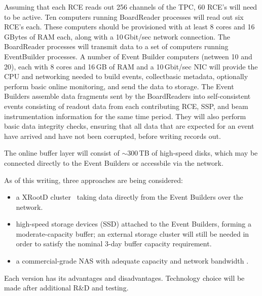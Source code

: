 Assuming that each RCE reads out 256 channels of the TPC, 60 RCE's
will need to be active.  Ten computers running BoardReader
processes will read out six RCE's each.  These computers should be
provisioned with at least 8 cores and 16 GBytes of RAM each, along
with a 10\,Gbit/sec network connection.  The BoardReader processes will
transmit data to a set of computers running EventBuilder processes.
A number of Event Builder computers (netween 10 and 20), each with 8 cores and 16\,GB of RAM
and a 10\,Gbit/sec NIC will provide the CPU and networking needed to
build events, collectbasic metadata, optionally perform basic online monitoring,
and send the data to storage.  The Event Builders assemble data fragments sent by the
BoardReaders into self-consistent events consisting of readout data
from each contributing RCE, SSP, and beam instrumentation information
for the same time period.  They will also perform basic data integrity
checks, ensuring that all data that are expected for an event have
arrived and have not been corrupted, before writing records out.

The online buffer layer will consist of $\sim$300\,TB of high-speed disks, which may be connected directly to the Event Builders
or accessbile via the network.  

As of this writing, three approaches are being considered:
\begin{itemize}
\item a XRootD cluster~\cite{xrootd} taking data directly from the Event Builders over the network.

\item high-speed storage devices (SSD) attached to the Event Builders, forming a moderate-capacity buffer;
an external storage cluster will still be needed in order to satisfy the nominal 3-day buffer capacity requirement.

\item a commercial-grade NAS with adequate capacity and network bandwidth .

\end{itemize}

\noindent Each version has its advantages and disadvantages. Technology choice will be made after
additional R\&D and testing.

